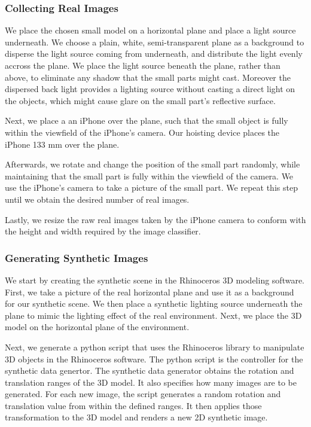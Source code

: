 \subsubsection{Collecting Real Images}
We place the chosen small model on a horizontal plane and place a light source underneath. We choose a plain, white, semi-transparent plane as a background to disperse the light source coming from underneath, and distribute the light evenly accross the plane. We place the light source beneath the plane, rather than above, to eliminate any shadow that the small parts might cast. Moreover the dispersed back light provides a lighting source without casting a direct light on the objects, which might cause glare on the small part's reflective surface.

Next, we place a an iPhone over the plane, such that the small object is fully within the viewfield of the iPhone's camera. Our hoisting device places the iPhone 133 mm over the plane.

Afterwards, we rotate and change the position of the small part randomly, while maintaining that the small part is fully within the viewfield of the camera. We use the iPhone's camera to take a picture of the small part. We repeat this step until we obtain the desired number of real images.

Lastly, we resize the raw real images taken by the iPhone camera to conform with the height and width required by the image classifier.

\subsubsection{Generating Synthetic Images}
We start by creating the synthetic scene in the Rhinoceros 3D modeling software. First, we take a picture of the real horizontal plane and use it as a background for our synthetic scene. We then place a synthetic lighting source underneath the plane to mimic the lighting effect of the real environment. Next, we place the 3D model on the horizontal plane of the environment.

Next, we generate a python script that uses the Rhinoceros library to manipulate 3D objects in the Rhinoceros software. The python script is the controller for the synthetic data genertor. The synthetic data generator obtains the rotation and translation ranges of the 3D model. It also specifies how many images are to be generated. For each new image, the script generates a random rotation and translation value from within the defined ranges. It then applies those transformation to the 3D model and renders a new 2D synthetic image.

